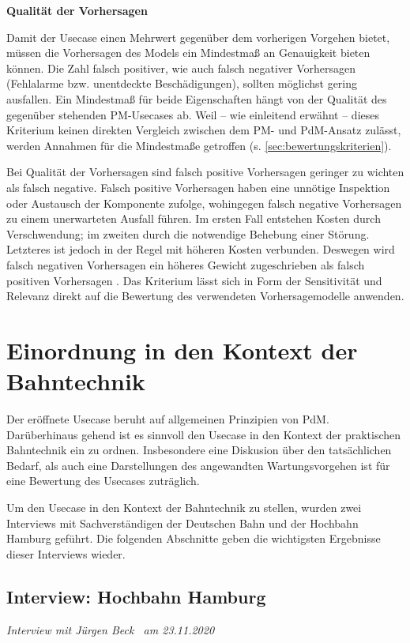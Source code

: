 \textbf{Qualität der Vorhersagen}

Damit der Usecase einen Mehrwert gegenüber dem vorherigen Vorgehen bietet, müssen die Vorhersagen des Models ein Mindestmaß an Genauigkeit bieten können. Die Zahl falsch positiver, wie auch falsch negativer Vorhersagen (Fehlalarme bzw. unentdeckte Beschädigungen), sollten möglichst gering ausfallen. Ein Mindestmaß für beide Eigenschaften hängt von der Qualität des gegenüber stehenden PM-Usecases ab. Weil -- wie einleitend erwähnt -- dieses Kriterium keinen direkten Vergleich zwischen dem PM- und PdM-Ansatz zulässt, werden Annahmen für die Mindestmaße getroffen (s. \cref{sec:bewertungskriterien}).

Bei Qualität der Vorhersagen sind falsch positive Vorhersagen geringer zu wichten als falsch negative. Falsch positive Vorhersagen haben eine unnötige Inspektion oder Austausch der Komponente zufolge, wohingegen falsch negative Vorhersagen zu einem unerwarteten Ausfall führen. Im ersten Fall entstehen Kosten durch Verschwendung; im zweiten durch die notwendige Behebung einer Störung. Letzteres ist jedoch in der Regel mit höheren Kosten verbunden. Deswegen wird falsch negativen Vorhersagen ein höheres Gewicht zugeschrieben als falsch positiven Vorhersagen . 
Das Kriterium lässt sich in Form der Sensitivität und Relevanz direkt auf die Bewertung des verwendeten Vorhersagemodelle anwenden.
\section{Einordnung in den Kontext der Bahntechnik}
\label{sec:kontext_bahntechnik_von_usecase}
Der eröffnete Usecase beruht auf allgemeinen Prinzipien von PdM. Darüberhinaus gehend ist es sinnvoll den Usecase in den Kontext der praktischen Bahntechnik ein zu ordnen. Insbesondere eine Diskusion über den tatsächlichen Bedarf, als auch eine Darstellungen des angewandten Wartungsvorgehen ist für eine Bewertung des Usecases zuträglich.

Um den Usecase in den Kontext der Bahntechnik zu stellen, wurden zwei Interviews mit Sachverständigen der Deutschen Bahn und der Hochbahn Hamburg geführt. Die folgenden Abschnitte geben die wichtigsten Ergebnisse dieser Interviews wieder.
\subsection{Interview: Hochbahn Hamburg}
\label{subsec:interview_hochbahn}
\textit{Interview mit Jürgen Beck~\cite{hochbahn.2020} am {23.11.2020}}

